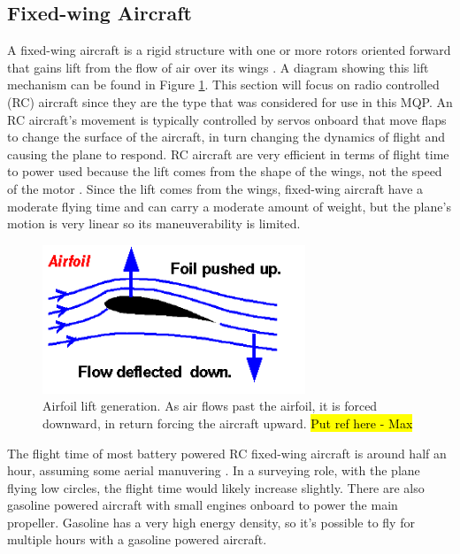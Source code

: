 \subsection{Fixed-wing Aircraft}
A fixed-wing aircraft is a rigid structure with one or more rotors oriented forward that gains lift from the flow of air over its wings \cite{airplane_book}. A diagram showing this lift mechanism can be found in Figure \ref{fig:airfoil_lift}. This section will focus on radio controlled (RC) aircraft since they are the type that was considered for use in this MQP. An RC aircraft’s movement is typically controlled by servos onboard that move flaps to change the surface of the aircraft, in turn changing the dynamics of flight and causing the plane to respond. RC aircraft are very efficient in terms of flight time to power used because the lift comes from the shape of the wings, not the speed of the motor \cite{airplane_site}. Since the lift comes from the wings, fixed-wing aircraft have a moderate flying time and can carry a moderate amount of weight, but the plane’s motion is very linear so its maneuverability is limited.\par
\begin{figure}[ht]
\centering
\includegraphics[width=0.70\textwidth]{img/airfoil_lift.png}
\caption{Airfoil lift generation. As air flows past the airfoil, it is forced downward, in return forcing the aircraft upward. \hl{Put ref here - Max}}
\label{fig:airfoil_lift}
\end{figure}\par
The flight time of most battery powered RC fixed-wing aircraft is around half an hour, assuming some aerial manuvering \cite{airplane_book}. In a surveying role, with the plane flying low circles, the flight time would likely increase slightly. There are also gasoline powered aircraft with small engines onboard to power the main propeller. Gasoline has a very high energy density, so it’s possible to fly for multiple hours with a gasoline powered aircraft.\par
